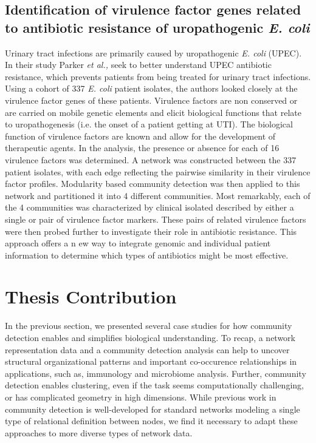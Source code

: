 \subsection{Identification of virulence factor genes related to antibiotic resistance of uropathogenic \emph{E. coli}}
\indent Urinary tract infections are primarily caused by uropathogenic \emph{E. coli} (UPEC). In their study Parker \emph{et al.,} seek to better understand UPEC antibiotic resistance, which prevents patients from being treated for urinary tract infections. Using a cohort of 337 \emph{E. coli} patient isolates, the authors looked closely at the virulence factor genes of these patients. Virulence factors are non conserved or are carried on mobile genetic elements and elicit biological functions that relate to uropathogenesis (i.e. the onset of a patient getting at UTI). The biological function of virulence factors are known and allow for the development of therapeutic agents. In the analysis, the presence or absence for each of 16 virulence factors was determined. A network was constructed between the 337 patient isolates, with each edge reflecting the pairwise similarity in their virulence factor profiles. Modularity based community detection was then applied to this network and partitioned it into 4 different communities. Most remarkably, each of the 4 communities was characterized by clinical isolated described by either a single or pair of virulence factor markers. These pairs of related virulence factors were then probed further to investigate their role in antibiotic resistance. This approach offers a n ew way to integrate genomic and individual patient information to determine which types of antibiotics might be most effective.  

\section{Thesis Contribution}
In the previous section, we presented several case studies for how community detection enables and simplifies biological understanding. To recap, a network representation data and a community detection analysis can help to uncover structural organizational patterns and important co-occurence relationships in applications, such as, immunology and microbiome analysis. Further, community detection enables clustering, even if the task seems computationally challenging, or has complicated geometry in high dimensions. While previous work in community detection is well-developed for standard networks modeling a single type of relational definition between nodes, we find it necessary to adapt these approaches to more diverse types of network data.  

